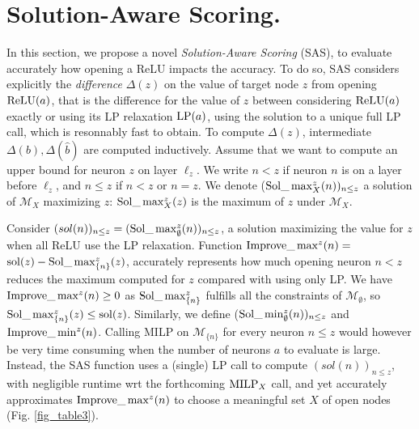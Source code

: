 \section{Solution-Aware Scoring.}

\label{sec4}

In this section, we propose a novel {\em Solution-Aware Scoring} (SAS),
to evaluate accurately how opening a ReLU impacts the accuracy.
To do so, SAS considers explicitly the {\em difference} $\Delta(z)$ on the value of target node $z$ from opening $\mathrm{ReLU}(a)$, that is the difference for the value of $z$ between considering $\mathrm{ReLU}(a)$ exactly or using its LP relaxation ${\textrm{LP}}(a)$, using the solution to a unique full LP call, which is resonnably fast to obtain. To compute $\Delta(z)$, intermediate $\Delta(b),\Delta(\hat{b})$ are computed inductively.
Assume that we want to compute an upper bound for neuron $z$ on layer $\ell_z$.
We write $n < z$ if neuron $n$ is on a layer before $\ell_z$, and $n \leq z$ if $n< z$ or $n=z$. We denote ($\mathrm{Sol}\_\max_X^z(n))_{n \leq z}$ a solution of $\mathcal{M}_X$ maximizing $z$: $\mathrm{Sol}\_\max_X^z(z)$ is the maximum of $z$ under $\mathcal{M}_X$.

Consider $(sol(n))_{n \leq z} = (\mathrm{Sol}\_\max_\emptyset^z(n))_{n \leq z}$, a solution maximizing the value for $z$ when all ReLU use the LP relaxation.
Function
$\mathrm{Improve}\_\max^z(n)=$ $\mathrm{sol}(z) - \mathrm{Sol}\_\max_{\{n\}}^z(z)$, 
accurately represents how much opening neuron $n < z$ reduces the maximum computed for $z$
compared with using only LP. 
We have $\mathrm{Improve}\_\max^z(n)\geq 0$ as $\mathrm{Sol}\_\max_{\{n\}}^z$ fulfills all the constraints of 
$\mathcal{M}_\emptyset$, so $\mathrm{Sol}\_\max_{\{n\}}^z(z) \leq \mathrm{sol}(z)$.
Similarly, we define ($\mathrm{Sol}\_\min_\emptyset^z(n))_{n \leq z}$ and 
$\mathrm{Improve}\_\min^z(n)$. 
Calling MILP on $\mathcal{M}_{\{n\}}$ for every neuron $n \leq z$
would however be very time consuming when the number of neurons $a$ to evaluate is large.
Instead, the SAS function uses a (single) LP call to compute $(sol(n))_{n \leq z}$, with negligible runtime wrt the forthcoming  ${\textrm{MILP}}_X$ call, and yet accurately approximates $\mathrm{Improve}\_\max^z(n)$ to choose a meaningful set $X$ of open nodes (Fig. \ref{fig_table3}).


